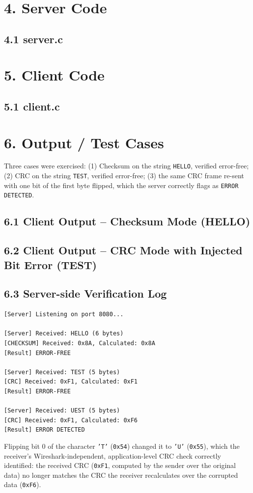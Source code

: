 \documentclass[11pt]{article}
\begin{document}
\section*{4. Server Code}
\subsection*{4.1 server.c}


\section*{5. Client Code}
\subsection*{5.1 client.c}


\section*{6. Output / Test Cases}
Three cases were exercised: (1) Checksum on the string \texttt{HELLO}, verified error-free; (2)
CRC on the string \texttt{TEST}, verified error-free; (3) the same CRC frame re-sent with one bit
of the first byte flipped, which the server correctly flags as \texttt{ERROR DETECTED}.

\subsection*{6.1 Client Output -- Checksum Mode (HELLO)}


\subsection*{6.2 Client Output -- CRC Mode with Injected Bit Error (TEST)}


\subsection*{6.3 Server-side Verification Log}
\begin{lstlisting}[style=outstyle]
[Server] Listening on port 8080...

[Server] Received: HELLO (6 bytes)
[CHECKSUM] Received: 0x8A, Calculated: 0x8A
[Result] ERROR-FREE

[Server] Received: TEST (5 bytes)
[CRC] Received: 0xF1, Calculated: 0xF1
[Result] ERROR-FREE

[Server] Received: UEST (5 bytes)
[CRC] Received: 0xF1, Calculated: 0xF6
[Result] ERROR DETECTED
\end{lstlisting}
Flipping bit 0 of the character \texttt{'T'} (\texttt{0x54}) changed it to \texttt{'U'}
(\texttt{0x55}), which the receiver's Wireshark-independent, application-level CRC check
correctly identified: the received CRC (\texttt{0xF1}, computed by the sender over the original
data) no longer matches the CRC the receiver recalculates over the corrupted data
(\texttt{0xF6}).
\end{document}
